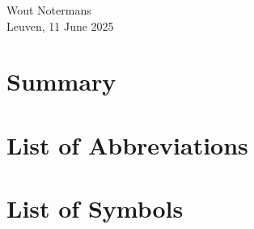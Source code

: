 \begin{flushright}
  Wout Notermans\\
  Leuven, 11 June 2025
\end{flushright}
\newpage

\thispagestyle{empty}
\null
\newpage

\chapter{Summary}
\newpage

\chapter{List of Abbreviations}
\newpage

\chapter{List of Symbols}
\newpage
